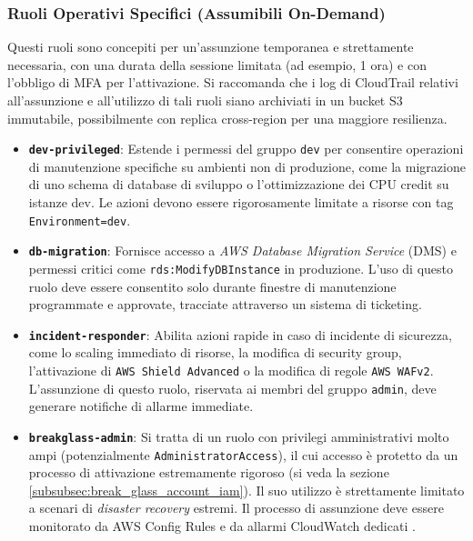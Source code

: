 \subsubsection{Ruoli Operativi Specifici (Assumibili On-Demand)}
\label{subsubsec:ruoli_specifici_iam}
Questi ruoli sono concepiti per un'assunzione temporanea e strettamente necessaria, con una durata della sessione limitata (ad esempio, 1 ora) e con l'obbligo di MFA per l'attivazione. Si raccomanda che i log di CloudTrail relativi all'assunzione e all'utilizzo di tali ruoli siano archiviati in un bucket S3 immutabile, possibilmente con replica cross-region per una maggiore resilienza.

\begin{itemize}
  \item \textbf{\texttt{dev-privileged}}: Estende i permessi del gruppo \texttt{dev} per consentire operazioni di manutenzione specifiche su ambienti non di produzione, come la migrazione di uno schema di database di sviluppo o l'ottimizzazione dei CPU credit su istanze dev. Le azioni devono essere rigorosamente limitate a risorse con tag \texttt{Environment=dev}.
  \item \textbf{\texttt{db-migration}}: Fornisce accesso a \emph{AWS Database Migration Service} (DMS) e permessi critici come \texttt{rds:ModifyDBInstance} in produzione. L'uso di questo ruolo deve essere consentito solo durante finestre di manutenzione programmate e approvate, tracciate attraverso un sistema di ticketing.
  \item \textbf{\texttt{incident-responder}}: Abilita azioni rapide in caso di incidente di sicurezza, come lo scaling immediato di risorse, la modifica di security group, l'attivazione di \texttt{AWS Shield Advanced} o la modifica di regole \texttt{AWS WAFv2}. L'assunzione di questo ruolo, riservata ai membri del gruppo \texttt{admin}, deve generare notifiche di allarme immediate.
  \item \textbf{\texttt{breakglass-admin}}: Si tratta di un ruolo con privilegi amministrativi molto ampi (potenzialmente \texttt{AdministratorAccess}), il cui accesso è protetto da un processo di attivazione estremamente rigoroso (si veda la sezione \ref{subsubsec:break_glass_account_iam}). Il suo utilizzo è strettamente limitato a scenari di \emph{disaster recovery} estremi. Il processo di assunzione deve essere monitorato da AWS Config Rules e da allarmi CloudWatch dedicati \cite{AWSSTS}.
\end{itemize}

